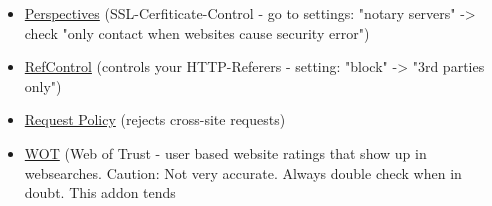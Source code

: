 \documentclass{article}
\begin{document}
\begin{itemize}
	\item \href{https://addons.mozilla.org/en-US/firefox/addon/perspectives/}{Perspectives} (SSL-Cerfiticate-Control - go to settings: "notary servers" -> check "only contact when websites cause security error")
	\item \href{https://addons.mozilla.org/en-US/firefox/addon/refcontrol/}{RefControl} (controls your HTTP-Referers - setting: "block" -> "3rd parties only")
	\item \href{https://addons.mozilla.org/en-US/firefox/addon/requestpolicy/}{Request Policy} (rejects cross-site requests)
	\item \href{https://addons.mozilla.org/en-US/firefox/addon/wot-safe-browsing-tool/}{WOT} (Web of Trust - user based website ratings that show up in websearches. Caution: Not very accurate. Always double check when in doubt. This addon tends


\end{itemize}
\end{document}
